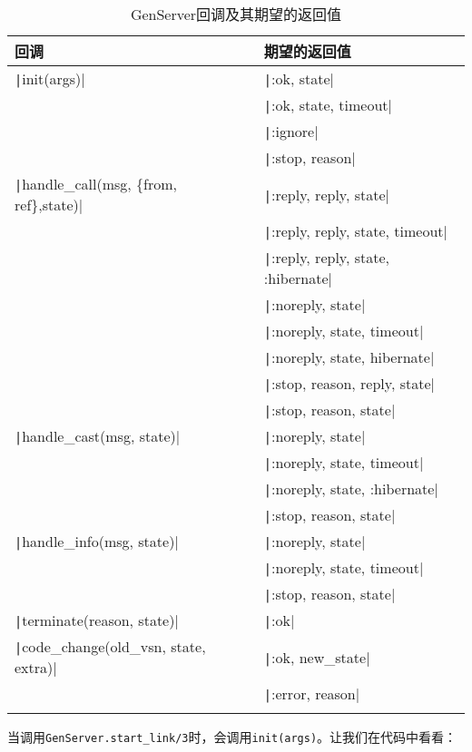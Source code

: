 \begin{longtable}[]{@{}ll@{}}
\toprule()
回调 & 期望的返回值 \\
\midrule()
\endhead
\texttt|init(args)| &
\texttt|{:ok, state}| \\
& \texttt|{:ok, state, timeout}| \\
& \texttt|:ignore| \\
& \texttt|{:stop, reason}| \\
\texttt|handle_call(msg, \{from, ref\},state)| &
\texttt|{:reply, reply, state}| \\
& \texttt|{:reply, reply, state, timeout}| \\
& \texttt|{:reply, reply, state, :hibernate}| \\
& \texttt|{:noreply, state}| \\
& \texttt|{:noreply, state, timeout}| \\
& \texttt|{:noreply, state, hibernate}| \\
& \texttt|{:stop, reason, reply, state}| \\
& \texttt|{:stop, reason, state}| \\
\texttt|handle_cast(msg, state)| &
\texttt|{:noreply, state}| \\
& \texttt|{:noreply, state, timeout}| \\
& \texttt|{:noreply, state, :hibernate}| \\
& \texttt|{:stop, reason, state}| \\
\texttt|handle_info(msg, state)| &
\texttt|{:noreply, state}| \\
& \texttt|{:noreply, state, timeout}| \\
& \texttt|{:stop, reason, state}| \\
\texttt|terminate(reason, state)| &
\texttt|:ok| \\
\texttt|code_change(old_vsn, state, extra)| &
\texttt|{:ok, new_state}| \\
& \texttt|{:error, reason}| \\
\bottomrule()
\caption{GenServer回调及其期望的返回值}
\label{table:genserver_callbacks}
\end{longtable}

当调用\texttt{GenServer.start\_link/3}时，会调用\texttt{init(args)}。让我们在代码中看看：

